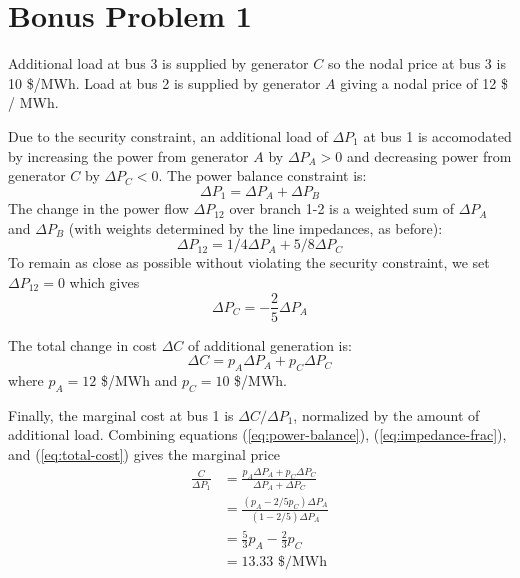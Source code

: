 \documentclass{homework}
\begin{document}
\section{Bonus Problem 1}

Additional load at bus 3 is supplied by generator $C$ so the nodal price at bus 3 is 10 \$/MWh.
Load at bus 2 is supplied by generator $A$ giving a nodal price of 12 \$ / MWh.

Due to the security constraint, an additional load of $\Delta P_1$ at bus 1 is accomodated by increasing
the power from generator $A$ by $\Delta P_A > 0$ and decreasing power from generator $C$ by $\Delta P_C < 0$.
The power balance constraint is:
\begin{equation}
    \Delta P_1 = \Delta P_A + \Delta P_B
    \label{eq:power-balance}
\end{equation}
The change in the power flow $\Delta P_{12}$ over branch 1-2 is a weighted sum of $\Delta P_A$ and $\Delta P_B$
(with weights determined by the line impedances, as before):
\begin{equation*}
    \Delta P_{12} = 1/4 \Delta P_A + 5/8 \Delta P_C
\end{equation*}
To remain as close as possible without violating the security constraint, we set $\Delta P_{12} = 0$
which gives
\begin{equation}
    \Delta P_C = - \frac{2}{5} \Delta P_A
    \label{eq:impedance-frac}
\end{equation}

The total change in cost $\Delta C$ of additional generation is:
\begin{equation}
    \Delta C = p_A \Delta P_A + p_C \Delta P_C
    \label{eq:total-cost}
\end{equation}
where $p_A = 12$ \$/MWh and $p_C = 10$ \$/MWh.

Finally, the marginal cost at bus 1 is $\Delta C / \Delta P_1$, normalized by the amount of additional load.
Combining equations (\ref{eq:power-balance}), (\ref{eq:impedance-frac}), and (\ref{eq:total-cost}) gives
the marginal price
\begin{align*}
    \frac{C}{\Delta P_1} &= \frac{p_A \Delta P_A + p_C \Delta P_C}{\Delta P_A + \Delta P_C} \\
        &= \frac{(p_A - 2/5 p_C) \Delta P_A } {(1-2/5) \Delta P_A} \\
        &= \frac{5}{3} p_A - \frac{2}{3} p_C \\
        &= 13.33 \text{ \$/MWh}
\end{align*}
\end{document}
